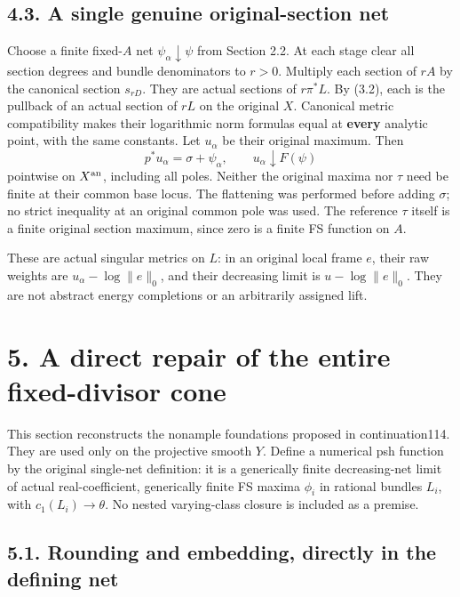 \documentclass[
  10pt,
]{article}
\begin{document}
\subsection{4.3. A single genuine original-section
net}\label{a-single-genuine-original-section-net}

Choose a finite fixed-\(A\) net \(\psi_\alpha\downarrow\psi\) from
Section 2.2. At each stage clear all section degrees and bundle
denominators to \(r>0\). Multiply each section of \(rA\) by the
canonical section \(s_{rD}\). They are actual sections of \(r\pi^*L\).
By (3.2), each is the pullback of an actual section of \(rL\) on the
original \(X\). Canonical metric compatibility makes their logarithmic
norm formulas equal at \textbf{every} analytic point, with the same
constants. Let \(u_\alpha\) be their original maximum. Then
\[p^*u_\alpha=\sigma+\psi_\alpha,\qquad u_\alpha\downarrow F(\psi) \tag{4.2}\]
pointwise on \(X^{\rm an}\), including all poles. Neither the original
maxima nor \(\tau\) need be finite at their common base locus. The
flattening was performed before adding \(\sigma\); no strict inequality
at an original common pole was used. The reference \(\tau\) itself is a
finite original section maximum, since zero is a finite FS function on
\(A\).

These are actual singular metrics on \(L\): in an original local frame
\(e\), their raw weights are \(u_\alpha-\log\|e\|_0\), and their
decreasing limit is \(u-\log\|e\|_0\). They are not abstract energy
completions or an arbitrarily assigned lift.

\section{5. A direct repair of the entire fixed-divisor
cone}\label{a-direct-repair-of-the-entire-fixed-divisor-cone}

This section reconstructs the nonample foundations proposed in
continuation114. They are used only on the projective smooth \(Y\).
Define a numerical psh function by the original single-net definition:
it is a generically finite decreasing-net limit of actual
real-coefficient, generically finite FS maxima \(\phi_i\) in rational
bundles \(L_i\), with \(c_1(L_i)\to\theta\). No nested varying-class
closure is included as a premise.

\subsection{5.1. Rounding and embedding, directly in the defining
net}\label{rounding-and-embedding-directly-in-the-defining-net}
\end{document}
